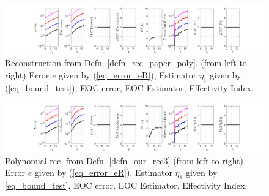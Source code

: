 \documentclass[12pt,a4paper]{article}
\numberwithin{equation}{section}
\theoremstyle{definition}
\begin{document}
\begin{figure}[H]
	\hspace{-3cm}
	\includegraphics[scale=0.55]{fig_LeapFrogplots_1x5_sin_IC_harmonic_u1_v9_paperrec_poly_our_res}	
		\caption{Reconstruction from Defn. \ref{defn_rec_paper_poly}. (from left to right) Error $e$ given by (\ref{eq_error_eR}), Estimator $\eta_1$ given by (\ref{eq_bound_test}), EOC error, EOC Estimator, Effectivity Index.}
	\label{fig_all_in_one_paperrec_poly_u01_v09}
\end{figure}
\begin{figure}[H]
	\hspace{-3cm}
	\includegraphics[scale=0.55]{fig_LeapFrogplots_1x5_sin_IC_harmonic_u1_v9_paperrec_poly_tristan}	
	\caption{Polynomial  rec. from Defn. \ref{defn_our_rec3} (from left to right) Error $e$ given by (\ref{eq_error_eR}), Estimator $\eta_1$ given by \ref{eq_bound_test}, EOC error, EOC Estimator, Effectivity Index.}
	\label{fig_all_in_one_paperrec_poly_tristan_u1_v9}
\end{figure}
\end{document}
